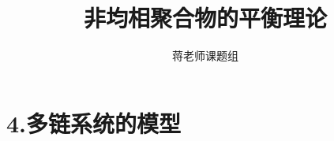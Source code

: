 \documentclass[12pt,a4paper]{article}
\title{非均相聚合物的平衡理论}
\author{蒋老师课题组}
\date{\chntoday}
\begin{document}
\maketitle
\section{4.多链系统的模型}






\cite{tam19912d}

\end{document}
